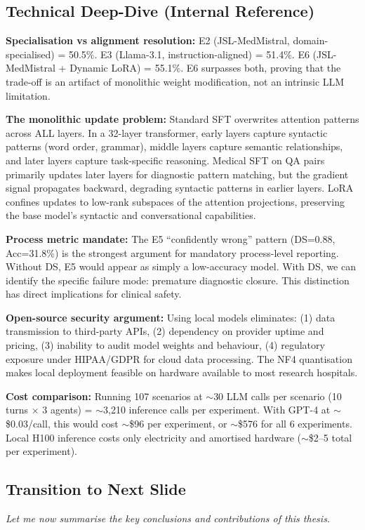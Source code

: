 \documentclass[12pt]{article}
\begin{document}
  \subsection*{Technical Deep-Dive (Internal Reference)}
  {\color{techgray}
  \textbf{Specialisation vs alignment resolution:} E2 (JSL-MedMistral, domain-specialised) = 50.5\%. E3 (Llama-3.1, instruction-aligned) = 51.4\%. E6 (JSL-MedMistral + Dynamic LoRA) = 55.1\%. E6 surpasses both, proving that the trade-off is an artifact of monolithic weight modification, not an intrinsic LLM limitation.

  \textbf{The monolithic update problem:} Standard SFT overwrites attention patterns across ALL layers. In a 32-layer transformer, early layers capture syntactic patterns (word order, grammar), middle layers capture semantic relationships, and later layers capture task-specific reasoning. Medical SFT on QA pairs primarily updates later layers for diagnostic pattern matching, but the gradient signal propagates backward, degrading syntactic patterns in earlier layers. LoRA confines updates to low-rank subspaces of the attention projections, preserving the base model's syntactic and conversational capabilities.

  \textbf{Process metric mandate:} The E5 ``confidently wrong'' pattern (DS=0.88, Acc=31.8\%) is the strongest argument for mandatory process-level reporting. Without DS, E5 would appear as simply a low-accuracy model. With DS, we can identify the specific failure mode: premature diagnostic closure. This distinction has direct implications for clinical safety.

  \textbf{Open-source security argument:} Using local models eliminates: (1) data transmission to third-party APIs, (2) dependency on provider uptime and pricing, (3) inability to audit model weights and behaviour, (4) regulatory exposure under HIPAA/GDPR for cloud data processing. The NF4 quantisation makes local deployment feasible on hardware available to most research hospitals.

  \textbf{Cost comparison:} Running 107 scenarios at $\sim$30 LLM calls per scenario (10 turns $\times$ 3 agents) = $\sim$3,210 inference calls per experiment. With GPT-4 at $\sim$\$0.03/call, this would cost $\sim$\$96 per experiment, or $\sim$\$576 for all 6 experiments. Local H100 inference costs only electricity and amortised hardware ($\sim$\$2--5 total per experiment).
  }

  \subsection*{Transition to Next Slide}
  {\color{transgreen}
  \textit{Let me now summarise the key conclusions and contributions of this thesis.}
  }
\end{document}
